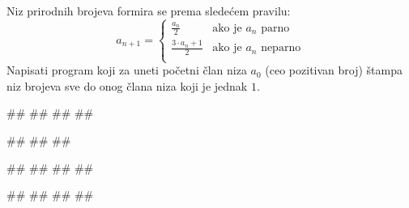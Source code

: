 \begin{Exercise}[difficulty=1, label=v1.3_09] 
Niz prirodnih brojeva formira se prema sledećem pravilu:
\begin{equation*}
a_{n+1} = \left\{
\begin{array}{rl}
\frac{a_n}{2} & \text{ako je } a_n \text{ parno}\\
\frac{3\cdot a_n + 1}{2} & \text{ako je } a_n \text{ neparno}\\
\end{array} \right.
\end{equation*}
Napisati program koji za uneti početni član niza $a_0$ (ceo pozitivan
broj) štampa niz brojeva sve do onog člana niza koji je jednak $1$. 


\begin{miditest}
\begin{upotreba}{1}
#\naslovInt#
##
##
##
\end{upotreba}
\end{miditest}
\begin{miditest}
\begin{upotreba}{2}
#\naslovInt#
##
##
\end{upotreba}
\end{miditest}

\begin{miditest}
\begin{upotreba}{3}
#\naslovInt#
##
##
##
\end{upotreba}
\end{miditest}
\begin{miditest}
\begin{upotreba}{4}
#\naslovInt#
##
##
##
\end{upotreba}
\end{miditest}
\end{Exercise}
\begin{Answer}[ref=v1.3_09]
\end{Answer}


